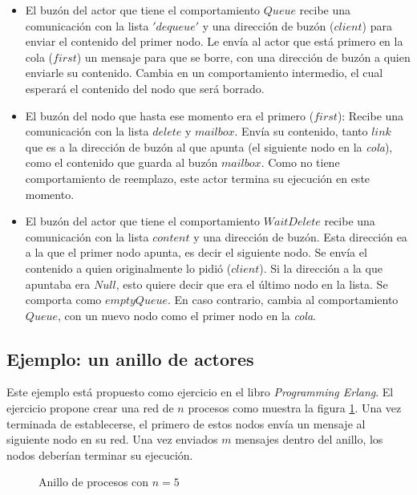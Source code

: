 \begin{itemize}
 \item El buzón del actor que tiene el comportamiento $Queue$ recibe una comunicación con la lista $'dequeue'$ y una dirección de buzón ($client$) para enviar el contenido del primer nodo.
 \subitem Le envía al actor que está primero en la cola ($first$) un mensaje para que se borre, con una dirección de buzón a quien enviarle su contenido.
 \subitem Cambia en un comportamiento intermedio, el cual esperará el contenido del nodo que será borrado.
 \item El buzón del nodo que hasta ese momento era el primero ($first$):
 \subitem Recibe una comunicación con la lista $delete$ y $mailbox$.
 \subitem Envía su contenido, tanto $link$ que es a la dirección de buzón al que apunta (el siguiente nodo en la \textit{cola}), como el contenido que guarda al buzón $mailbox$. Como no tiene comportamiento de reemplazo, este actor termina su ejecución en este momento.
 \item El buzón del actor que tiene el comportamiento $WaitDelete$ recibe una comunicación con la lista $content$ y una dirección de buzón. Esta dirección ea a la que el primer nodo apunta, es decir el siguiente nodo.
 \subitem Se envía el contenido a quien originalmente lo pidió ($client$).
 \subitem Si la dirección a la que apuntaba era $Null$, esto quiere decir que era el último nodo en la lista. Se comporta como $emptyQueue$.
 \subitem En caso contrario, cambia al comportamiento $Queue$, con un nuevo nodo como el primer nodo en la \textit{cola}.
\end{itemize}


\subsection{Ejemplo: un anillo de actores}
Este ejemplo está propuesto como ejercicio en el libro \textit{Programming Erlang}\cite[Página 115, Ejercicio 4-2: The Process Ring]{Cesarini:2009:EP:1717841}. El ejercicio propone crear una red de $n$ procesos como muestra la figura \ref{fig:anillo}. Una vez terminada de establecerse, el primero de estos nodos envía un mensaje al siguiente nodo en su red.  Una vez enviados $m$ mensajes dentro del anillo, los nodos deberían terminar su ejecución.

\begin{figure}[H]
\centering
{}
\caption{Anillo de procesos con $n=5$}
\label{fig:anillo}
\end{figure}

